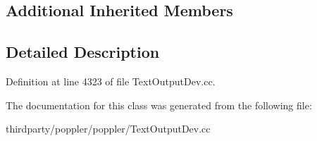 \subsection*{Additional Inherited Members}


\subsection{Detailed Description}


Definition at line 4323 of file Text\+Output\+Dev.\+cc.



The documentation for this class was generated from the following file\+:\begin{DoxyCompactItemize}
\item 
thirdparty/poppler/poppler/Text\+Output\+Dev.\+cc\end{DoxyCompactItemize}
